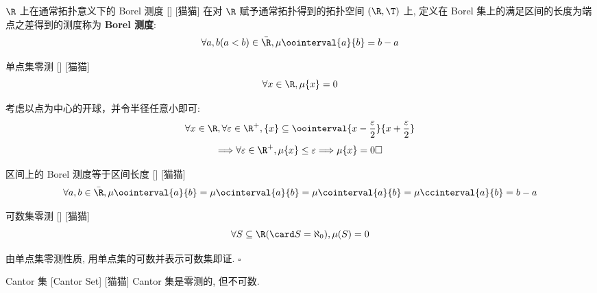 \documentclass[UTF8]{ctexart}
\begin{document}
            \begin{dfn}
                {\(\R\) 上在通常拓扑意义下的 Borel 测度}
                []
                [猫猫]
                在对 \(\R\) 赋予通常拓扑得到的拓扑空间 \((\R,\T)\) 上, 定义在 Borel 集上的满足区间的长度为端点之差得到的测度称为 \textbf{Borel 测度}: 
                \[\forall a,b(a<b)\in\bar\R, \mu\oointerval{a}{b}=b-a\]
            \end{dfn}
            
            \begin{ppt}
                {单点集零测}
                []
                [猫猫]
                \[\forall x\in\R, \mu\{x\}=0\]
            \end{ppt}
            
            \begin{prf}
                考虑以点为中心的开球，并令半径任意小即可: 
                \[\forall x\in\R, \forall\varepsilon\in\R^+, \{x\}\subseteq\oointerval{x-\frac{\varepsilon}{2}}{x+\frac{\varepsilon}{2}}\]
                \[\Longrightarrow\forall\varepsilon\in\R^+, \mu\{x\}\leq\varepsilon\Longrightarrow\mu\{x\}=0\square\]
            \end{prf}
            
            \begin{ppt}
                {区间上的 Borel 测度等于区间长度}
                []
                [猫猫]
                \[\forall a,b\in\bar\R, 
                \mu\oointerval{a}{b}=
                \mu\ocinterval{a}{b}=
                \mu\cointerval{a}{b}=
                \mu\ccinterval{a}{b}=b-a\]
            \end{ppt}
            
            \begin{ppt}
                {可数集零测}
                []
                [猫猫]
                \[\forall S\subseteq\R(\card S=\aleph_0), \mu(S)=0\]
            \end{ppt}
            
            \begin{prf}
                由单点集零测性质, 用单点集的可数并表示可数集即证. \(\square\)
            \end{prf}
            
            \begin{cxmp}
                {Cantor 集}
                [Cantor Set]
                [猫猫]
                Cantor 集是零测的, 但不可数. 
            \end{cxmp}
            
\end{document}
